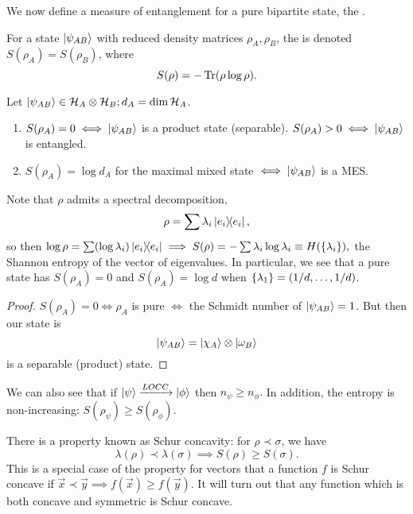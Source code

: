 We now define a measure of entanglement for a pure bipartite state, the .
\begin{defn}
    For a state $\lvert\psi_{AB}\rangle$ with reduced density matrices $\rho_A,\rho_B$, the  is denoted $S(\rho_A)=S(\rho_B)$, where
    \begin{equation}
         S(\rho)=-\operatorname{Tr}(\rho\log \rho).
    \end{equation}
\end{defn}
\begin{thm}
    Let $\lvert\psi_{AB}\rangle\in \mathcal H_A \otimes \mathcal H_B; d_A =\dim \mathcal H_A$.
    \begin{enumerate}
        \item $S(\rho_A)=0 \iff \lvert\psi_{AB}\rangle$ is a product state (separable). $S(\rho_A) >0 \iff \lvert\psi_{AB}\rangle$ is entangled.
        \item $S(\rho_A) = \log d_A$ for the maximal mixed state $\iff \lvert\psi_{AB}\rangle$ is a MES.
    \end{enumerate}
\end{thm}
Note that $\rho$ admits a spectral decomposition,
\begin{equation}
    \rho=\sum \lambda_i \left\lvert{e_i}\middle\rangle\!\middle\langle{e_i}\right\rvert,
\end{equation}
so then $\log\rho=\sum(\log\lambda_i) \left\lvert{e_i}\middle\rangle\!\middle\langle{e_i}\right\rvert \implies S(\rho)=-\sum \lambda_i \log \lambda_i \equiv H(\{\lambda_i\}),$
the Shannon entropy of the vector of eigenvalues. In particular, we see that a pure state has $S(\rho_A)=0$ and $S(\rho_A)=\log d$ when $\{\lambda_1\}=(1/d,\ldots,1/d)$.

\begin{proof}
    $S(\rho_A)=0 \iff \rho_A$ is pure $\iff$ the Schmidt number of $\lvert\psi_{AB}\rangle=1$. But then our state is
    \begin{equation}
        \lvert\psi_{AB}\rangle=\lvert\chi_A\rangle\otimes \lvert\omega_B\rangle
    \end{equation}
    is a separable (product) state.
\end{proof}
We can also see that if $\lvert\psi\rangle\xrightarrow{LOCC}\lvert\phi\rangle$ then $n_\psi \geq n_\phi.$ In addition, the entropy is non-increasing: $S(\rho_\psi)\geq S(\rho_\phi)$.

There is a property known as Schur concavity: for $\rho \prec \sigma$, we have
\begin{equation}
    \lambda(\rho)\prec \lambda(\sigma) \implies S(\rho)\geq S(\sigma).
\end{equation}
This is a special case of the property for vectors that a function $f$ is Schur concave if $\vec x \prec \vec y \implies f(\vec x) \geq f(\vec y)$. It will turn out that any function which is both concave and symmetric is Schur concave.

